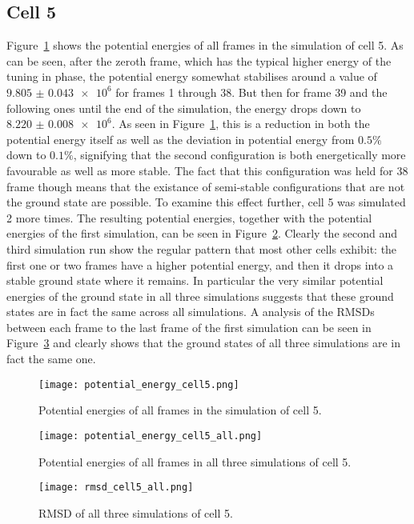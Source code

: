 
\subsection{Cell 5} %
\label{sub:cell_5}

Figure~\ref{fig:potential_energy_cell5} shows the potential energies of all frames in the simulation of cell 5. As can be seen, after the zeroth frame, which has the typical higher energy of the tuning in phase, the potential energy somewhat stabilises around a value of \(\num{9.805(43)e6}\) for frames 1 through 38. But then for frame 39 and the following ones until the end of the simulation, the energy drops down to \(\num{8.220(8)e6}\). As seen in Figure~\ref{fig:potential_energy_cell5}, this is a reduction in both the potential energy itself as well as the deviation in potential energy from \(0.5 \%\) down to \(0.1 \%\), signifying that the second configuration is both energetically more favourable as well as more stable. The fact that this configuration was held for 38 frame though means that the existance of semi-stable configurations that are not the ground state are possible. To examine this effect further, cell 5 was simulated 2 more times. The resulting potential energies, together with the potential energies of the first simulation, can be seen in Figure~\ref{fig:potential_energy_cell5_all}. Clearly the second and third simulation run show the regular pattern that most other cells exhibit: the first one or two frames have a higher potential energy, and then it drops into a stable ground state where it remains. In particular the very similar potential energies of the ground state in all three simulations suggests that these ground states are in fact the same across all simulations. A analysis of the RMSDs between each frame to the last frame of the first simulation can be seen in Figure~\ref{fig:rmsd_cell5_all} and clearly shows that the ground states of all three simulations are in fact the same one.

\begin{figure}[ht]
\centering
  \texttt{[image: potential\_energy\_cell5.png]}
  \caption{Potential energies of all frames in the simulation of cell 5.}
  \label{fig:potential_energy_cell5}
\end{figure}

\begin{figure}[ht]
\centering
  \texttt{[image: potential\_energy\_cell5\_all.png]}
  \caption{Potential energies of all frames in all three simulations of cell 5.}
  \label{fig:potential_energy_cell5_all}
\end{figure}

\begin{figure}[ht]
\centering
  \texttt{[image: rmsd\_cell5\_all.png]}
  \caption{RMSD of all three simulations of cell 5.}
  \label{fig:rmsd_cell5_all}
\end{figure}





